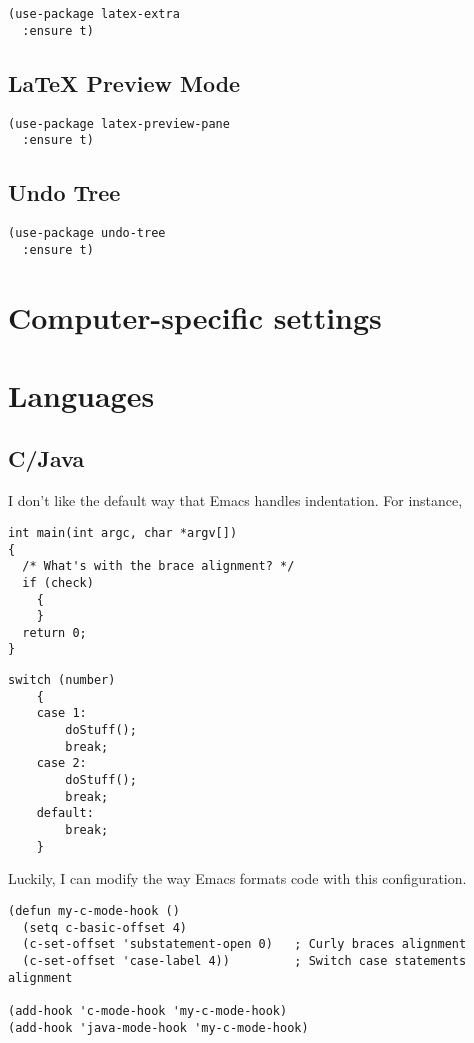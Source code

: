 \documentclass[11pt]{article}
\begin{document}
\begin{verbatim}
(use-package latex-extra
  :ensure t)
\end{verbatim}

\subsection{\LaTeX{} Preview Mode}
\label{sec-18-48}

\begin{verbatim}
(use-package latex-preview-pane
  :ensure t)
\end{verbatim}

\subsection{Undo Tree}
\label{sec-18-49}

\begin{verbatim}
(use-package undo-tree
  :ensure t)
\end{verbatim}

\section{Computer-specific settings}
\label{sec-19}
\section{Languages}
\label{sec-20}
\subsection{C/Java}
\label{sec-20-1}

I don't like the default way that Emacs handles indentation. For instance,

\begin{verbatim}
int main(int argc, char *argv[])
{
  /* What's with the brace alignment? */
  if (check)
    {
    }
  return 0;
}
\end{verbatim}

\begin{verbatim}
switch (number)
    {
    case 1:
        doStuff();
        break;
    case 2:
        doStuff();
        break;
    default:
        break;
    }
\end{verbatim}

Luckily, I can modify the way Emacs formats code with this configuration.

\begin{verbatim}
(defun my-c-mode-hook ()
  (setq c-basic-offset 4)
  (c-set-offset 'substatement-open 0)   ; Curly braces alignment
  (c-set-offset 'case-label 4))         ; Switch case statements alignment

(add-hook 'c-mode-hook 'my-c-mode-hook)
(add-hook 'java-mode-hook 'my-c-mode-hook)
\end{verbatim}
\end{document}
